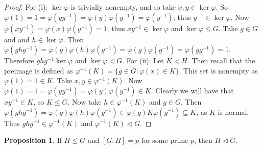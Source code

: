 \documentclass[9pt,reqno]{amsart}
\theoremstyle{definition}
\newtheorem{prop}{Proposition}[section]
\begin{document}
	\begin{proof}
		For (i): $\ker \varphi$ is trivially nonempty, and so take $x, y\in \ker \varphi$. So $\varphi(1) =1 =  \varphi (y y^{-1}) = \varphi (y) \varphi(y^{-1})  = \varphi(y^{-1})$; thus $y^{-1} \in \ker \varphi$. Now $\varphi (xy^{-1}) = \varphi (x) \varphi(y^{-1}) = 1$; thus $xy^{-1} \in \ker \varphi$ and $\ker \varphi \leq G$. Take $g \in G$ and and $h \in \ker \varphi$. Then $\varphi(ghg^{-1} )= \varphi(g)\varphi(h)\varphi(g^{-1}) = \varphi(g)\varphi(g^{-1}) = \varphi(gg^{-1}) = 1$. Therefore $ghg^{-1} \ker \varphi$ and $\ker \varphi \lhd G$. 
		For (ii): Let $K \lhd H$. Then recall that the preimage is defined as $\varphi^{-1}(K) = \{ g \in G \colon \varphi(x) \in K \}$. This set is nonempty as $\varphi(1)  = 1\in K$. Take $x, y \in \varphi^{-1}(K) $. Now $\varphi (1) = 1=  \varphi(y y^{-1}) = \varphi (y)\varphi (y^{-1}) \in K$. Clearly we will have that $xy^{-1} \in K$, so $K \leq G$. Now take $h \in \varphi^{-1} (K)$ and $g \in G$. Then $\varphi (ghg^{-1}) = \varphi(g) \varphi (h) \varphi (g^{-1}) \in \varphi (g) K \varphi(g^{-1}) \subseteq K$, as $K$ is normal. Thus $ghg^{-1} \in \varphi^{-1} (K)$ and $\varphi^{-1} (K) \lhd G$. 
	\end{proof}
	\begin{prop}
		If $H \leq G$ and $[G \colon H] = p$ for some prime $p$, then $H \lhd G$. 
	\end{prop}
	
	
\end{document}

